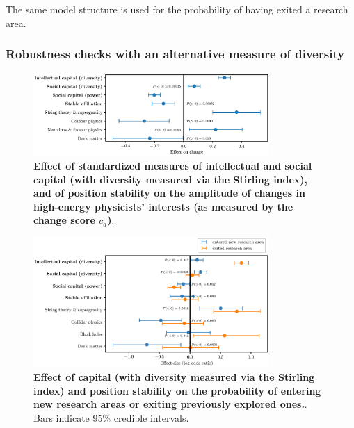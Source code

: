 \documentclass{article}
\begin{document}
The same model structure is used for the probability of having exited a research area.

\subsubsection{\label{appendix:robustness}Robustness checks with an alternative measure of diversity}

\begin{figure}[H]
    \centering
    \includegraphics[width=0.8\textwidth]{plots/change_score_effects_stirling_magnitude.eps}
    \caption{\textbf{Effect of standardized measures of intellectual and social capital (with diversity measured via the Stirling index), and of position stability on the amplitude of changes in high-energy physicists' interests (as measured by the change score $c_a$)}. }
    \label{fig:change_score_effect_stirling}
\end{figure}

\begin{figure}[H]
    \centering
    \includegraphics[width=0.8\textwidth]{plots/entered_score_effects_stirling.eps}
    \caption{\textbf{Effect of capital (with diversity measured via the Stirling index) and position stability on the probability of entering new research areas or exiting previously explored ones.}. Bars indicate 95\% credible intervals.}
    \label{fig:diversification_score_stirling}
\end{figure}


\end{document}

